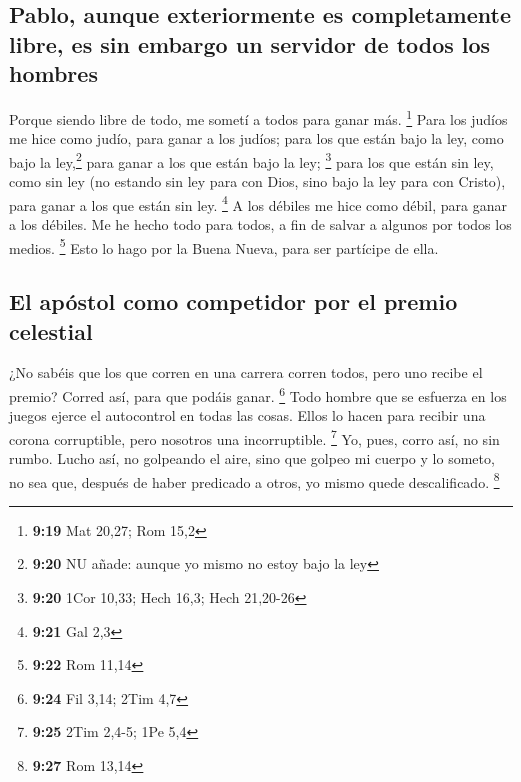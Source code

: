 \begin{paracol}{2}
\hypertarget{pablo-aunque-exteriormente-es-completamente-libre-es-sin-embargo-un-servidor-de-todos-los-hombres}{%
\subsection{Pablo, aunque exteriormente es completamente libre, es sin
embargo un servidor de todos los
hombres}\label{pablo-aunque-exteriormente-es-completamente-libre-es-sin-embargo-un-servidor-de-todos-los-hombres}}

 Porque siendo libre de todo, me sometí a todos para
ganar más. \footnote{\textbf{9:19} Mat 20,27; Rom 15,2} 
Para los judíos me hice como judío, para ganar a los judíos; para los
que están bajo la ley, como bajo la ley,\footnote{\textbf{9:20} NU
  añade: aunque yo mismo no estoy bajo la ley} para ganar a los que
están bajo la ley; \footnote{\textbf{9:20} 1Cor 10,33; Hech 16,3; Hech
  21,20-26}  para los que están sin ley, como sin ley (no
estando sin ley para con Dios, sino bajo la ley para con Cristo), para
ganar a los que están sin ley. \footnote{\textbf{9:21} Gal 2,3}
 A los débiles me hice como débil, para ganar a los
débiles. Me he hecho todo para todos, a fin de salvar a algunos por
todos los medios. \footnote{\textbf{9:22} Rom 11,14} 
Esto lo hago por la Buena Nueva, para ser partícipe de ella.

\hypertarget{el-apuxf3stol-como-competidor-por-el-premio-celestial}{%
\subsection{El apóstol como competidor por el premio
celestial}\label{el-apuxf3stol-como-competidor-por-el-premio-celestial}}

 ¿No sabéis que los que corren en una carrera corren
todos, pero uno recibe el premio? Corred así, para que podáis ganar.
\footnote{\textbf{9:24} Fil 3,14; 2Tim 4,7}  Todo hombre
que se esfuerza en los juegos ejerce el autocontrol en todas las cosas.
Ellos lo hacen para recibir una corona corruptible, pero nosotros una
incorruptible. \footnote{\textbf{9:25} 2Tim 2,4-5; 1Pe 5,4}
 Yo, pues, corro así, no sin rumbo. Lucho así, no
golpeando el aire,  sino que golpeo mi cuerpo y lo
someto, no sea que, después de haber predicado a otros, yo mismo quede
descalificado. \footnote{\textbf{9:27} Rom 13,14}

\switchcolumn
\begin{otherlanguage}{english}


\end{otherlanguage}
\end{paracol}
